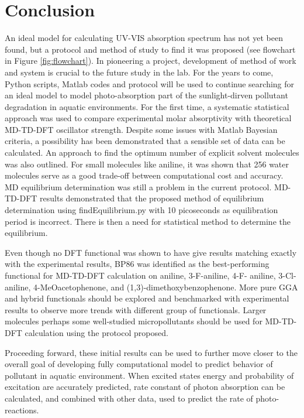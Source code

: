 \documentclass[
journal=jpcbfk, %
manuscript=article]{achemso}
\begin{document}
	\section{Conclusion}
	An ideal model for calculating UV-VIS absorption spectrum has not yet been found, but a protocol and method of study to find it was proposed (see flowchart in Figure \ref{fig:flowchart}). In pioneering a project, development of method of work and system is crucial to the future study in the lab. For the years to come, Python scripts, Matlab codes and protocol will be used to continue searching for an ideal model to model photo-absorption part of the sunlight-dirven pollutant degradation in aquatic environments. For the first time, a systematic statistical approach was used to compare experimental molar absorptivity with theoretical MD-TD-DFT oscillator strength. Despite some issues with Matlab Bayesian criteria, a possibility has been demonstrated that a sensible set of data can be calculated. An approach to find the optimum number of explicit solvent molecules was also outlined. For small molecules like aniline, it was shown that 256 water molecules serve as a good trade-off between computational cost and accuracy. MD equilibrium determination was still a problem in the current protocol. MD-TD-DFT results demonstrated that the proposed method of equilibrium determination using findEquilibrium.py with 10 picoseconds as equilibration period is incorrect. There is then a need for statistical method to determine the equilibrium. 
	
	Even though no DFT functional was shown to have give results matching exactly with the experimental results, BP86 was identified as the best-performing functional for MD-TD-DFT calculation on aniline, 3-F-aniline, 4-F- aniline, 3-Cl-aniline, 4-MeOacetophenone, and (1,3)-dimethoxybenzophenone. More pure GGA and hybrid functionals should be explored and benchmarked with experimental results to observe more trends with different group of functionals. Larger molecules perhaps some well-studied micropollutants should be used for MD-TD-DFT calculation using the protocol proposed. 
	
	Proceeding forward, these initial results can be used to further move closer to the overall goal of developing fully computational model to predict behavior of pollutant in aquatic environment. When excited states energy and probability of excitation are accurately predicted, rate constant of photon absorption can be calculated, and combined with other data, used to predict the rate of  photo-reactions.
	
\end{document}
